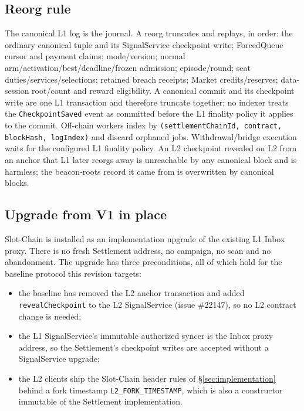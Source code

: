 \documentclass[a4paper,11pt]{article}
\newcommand{\code}[1]{\nolinkurl{#1}}
\begin{document}
\subsection{Reorg rule}

The canonical L1 log is the journal.  A reorg truncates and replays, in order:
the ordinary canonical tuple and its SignalService checkpoint write;
ForcedQueue cursor and payment claims; mode/version; normal
arm/activation/best/deadline/frozen admission; episode/round; seat
duties/services/selections; retained breach receipts; Market credits/reserves;
data-session root/count and reward eligibility.  A canonical commit and its
checkpoint write are one L1 transaction and therefore truncate together; no
indexer treats the \code{CheckpointSaved} event as committed before the L1
finality policy it applies to the commit.  Off-chain workers index by
\code{(settlementChainId, contract, blockHash, logIndex)} and discard orphaned
jobs.  Withdrawal/bridge execution waits for the configured L1 finality
policy.  An L2 checkpoint revealed on L2 from an anchor that L1 later reorgs
away is unreachable by any canonical block and is harmless; the beacon-roots
record it came from is overwritten by canonical blocks.

\subsection{Upgrade from V1 in place}\label{sec:upgrade}

Slot-Chain is installed as an implementation upgrade of the existing L1 Inbox
proxy.  There is no fresh Settlement address, no campaign, no scan and no
abandonment.  The upgrade has three preconditions, all of which hold for the
baseline protocol this revision targets:

\begin{itemize}
\item the baseline has removed the L2 anchor transaction and added
  \code{revealCheckpoint} to the L2 SignalService (issue \#22147), so no L2
  contract change is needed;
\item the L1 SignalService's immutable authorized syncer is the Inbox proxy
  address, so the Settlement's checkpoint writes are accepted without a
  SignalService upgrade;
\item the L2 clients ship the Slot-Chain header rules of
  \S\ref{sec:implementation} behind a fork timestamp
  \code{L2_FORK_TIMESTAMP}, which is also a constructor immutable of the
  Settlement implementation.
\end{itemize}
\end{document}
